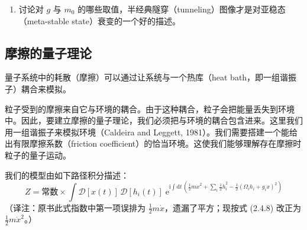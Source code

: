 \begin{enumerate}
\item[6.] 讨论对 $g$ 与 $m_0$ 的哪些取值，半经典隧穿（tunneling）图像才是对亚稳态（meta-stable state）衰变的一个好的描述。
\end{enumerate}

\subsection{摩擦的量子理论}

\begin{keypoints}
\item 量子系统中的耗散（摩擦）可以通过让系统与一个热库（heat bath，即一组谐振子）耦合来模拟。
\end{keypoints}

粒子受到的摩擦来自它与环境的耦合。由于这种耦合，粒子会把能量丢失到环境中。因此，要建立摩擦的量子理论，我们必须把与环境的耦合包含进来。这里我们用一组谐振子来模拟环境（Caldeira and Leggett, 1981）。我们需要搭建一个能给出有限摩擦系数（friction coefficient）的恰当环境。这使我们能够理解存在摩擦时粒子的量子运动。

我们的模型由如下路径积分描述：
\begin{equation*}
Z = \text{常数} \times \int \mathcal{D}[x(t)]\,\mathcal{D}[h_i(t)]\;\mathrm{e}^{\mathrm{i}\int \mathrm{d}t\,\left(\frac{1}{2}m\dot{x}^2 + \sum_i \frac{1}{2}\dot{h}_i^2 - \frac{1}{2}(\Omega_i h_i + g_i x)^2\right)}
\end{equation*}
（译注：原书此式指数中第一项误排为 $\frac{1}{2}m\dot{x}$，遗漏了平方；现按式 (2.4.8) 改正为 $\frac{1}{2}m\dot{x}^2$。）

